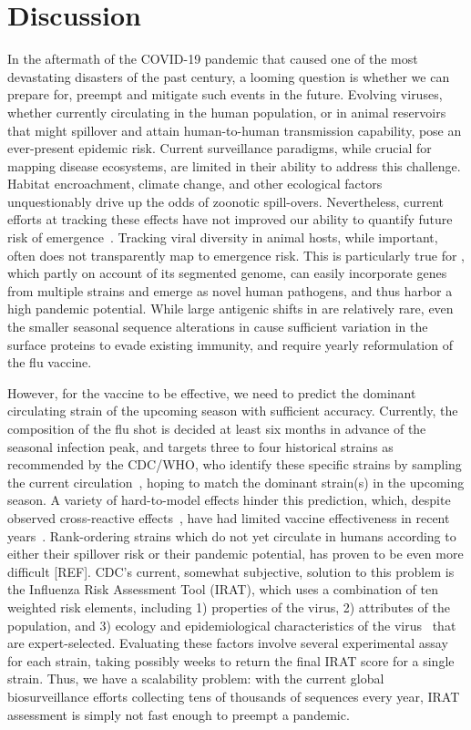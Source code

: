\documentclass[onecolumn, compsoc,10pt]{IEEEtran}
\begin{document}
{\color{Red1}
\section*{Discussion}
In the aftermath of the COVID-19 pandemic that caused one of the most devastating disasters of the past century, a looming question is whether we can prepare for, preempt and mitigate such events in the future. Evolving viruses, whether currently circulating in the human population, or in animal reservoirs that might spillover and attain human-to-human transmission capability, pose an ever-present epidemic risk.  Current surveillance paradigms, while crucial for mapping disease ecosystems, are limited in their ability to address this challenge. Habitat encroachment, climate change, and other ecological factors~\cite{rulli2017nexus,chua2002anthropogenic,childs2004zoonotic} unquestionably drive up the odds of zoonotic spill-overs. Nevertheless, current efforts at tracking these effects have not improved our ability to quantify future risk of emergence~\cite{fair2019viral}. Tracking viral diversity in animal hosts, while important, often does not transparently map to emergence risk.  This is particularly true for \infl, which partly on account of its segmented genome, can easily incorporate genes from multiple strains and emerge as novel human pathogens, and thus harbor a high pandemic potential. While large antigenic shifts in \infl are relatively rare, even the smaller seasonal sequence alterations in cause sufficient variation in the surface proteins to evade existing immunity, and require yearly reformulation of the flu vaccine.

However, for the  vaccine to be effective, we need to  predict the dominant circulating strain of the upcoming season with sufficient accuracy.
Currently, the composition of the flu shot is decided at least six months in advance of the seasonal infection peak, and targets three to four  historical strains as recommended by the CDC/WHO, who identify these specific strains by  sampling the current circulation~\cite{agor2018models}, hoping to match the  dominant strain(s) in the upcoming season. A variety of hard-to-model effects hinder this prediction, which, despite observed cross-reactive effects~\cite{tricco2013comparing}, have had  limited vaccine effectiveness in recent years~\cite{cdceff}. Rank-ordering strains which do not yet circulate in humans according to either their spillover risk or their pandemic potential, has proven to be even more difficult [REF]. CDC's current, somewhat subjective, solution to this problem is the Influenza Risk Assessment Tool (IRAT), which  uses a combination of ten weighted risk elements, including  1) properties of the virus, 2) attributes of the population, and 3) ecology and epidemiological characteristics of the virus~\cite{Influenz24:online} that are expert-selected. Evaluating these factors involve several experimental assay for each strain, taking possibly weeks to return the final IRAT  score for a single strain. Thus, we have a scalability problem: with  the current global biosurveillance efforts  collecting tens of thousands of sequences every year, IRAT assessment is simply not fast enough to  preempt a pandemic. }
\end{document}
